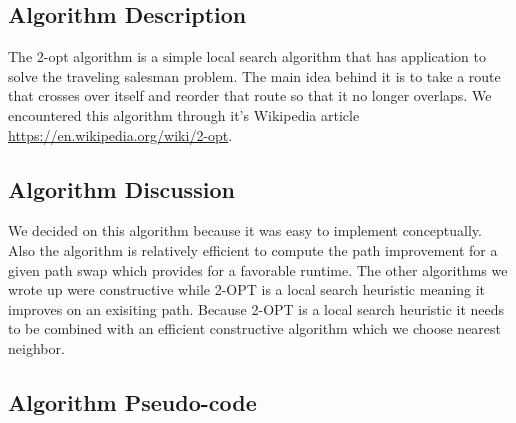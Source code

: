 \documentclass[../report/main.tex]{subfiles}
\begin{document}
\subsection*{Algorithm Description}

The 2-opt algorithm is a simple local search algorithm that has application to solve the traveling salesman problem. The main idea behind it is to take a route that crosses over itself and reorder that route so that it no longer overlaps. We encountered this algorithm through it's Wikipedia article \url{https://en.wikipedia.org/wiki/2-opt}.

\subsection*{Algorithm Discussion}

We decided on this algorithm because it was easy to implement conceptually. Also the algorithm is relatively efficient to compute the path improvement for a given path swap which provides for a favorable runtime. The other algorithms we wrote up were constructive while 2-OPT is a local search heuristic meaning it improves on an exisiting path. Because 2-OPT is a local search heuristic it needs to be combined with an efficient constructive algorithm which we choose nearest neighbor.

\subsection*{Algorithm Pseudo-code}
\end{document}
